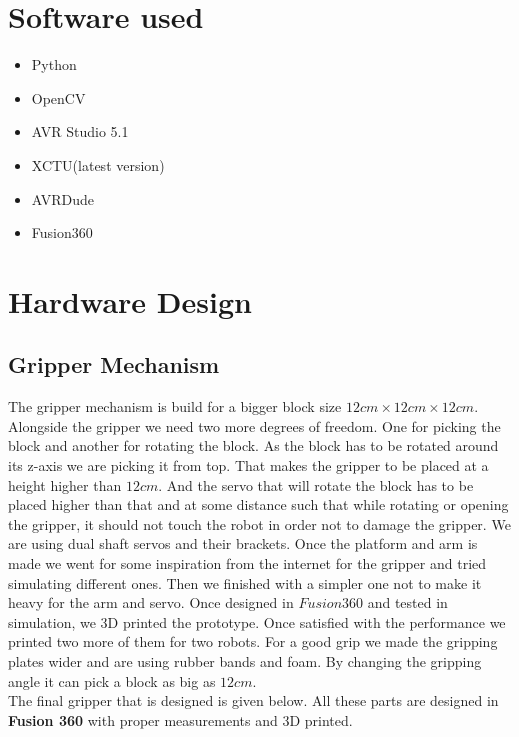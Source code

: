 \documentclass[a4paper,12pt,oneside]{book}
\begin{document}
\section{Software used}
\begin{itemize}
  \item Python
  \item OpenCV
  \item AVR Studio 5.1
  \item XCTU(latest version)
  \item AVRDude
  \item Fusion360
\end{itemize}
\section{Hardware Design}
\subsection*{Gripper Mechanism}
The gripper mechanism is build for a bigger block size $12cm\times{12cm\times{12cm}}$. Alongside the gripper we need two more degrees of freedom. One for picking the block and another for rotating the block. As the block has to be rotated around its z-axis we are picking it from top. That makes the gripper to be placed at a height higher than $12cm$. And the servo that will rotate the block has to be placed higher than that and at some
distance such that while rotating or opening the gripper, it should not touch the robot in order not to damage the gripper. We are using dual shaft servos and their brackets. Once the platform and arm is made we went for some inspiration from the internet for the gripper and tried simulating different ones. Then we finished with a simpler one not to make it heavy for the arm and servo. Once designed in $Fusion360$  and tested in simulation, we 3D printed the prototype. Once satisfied with the performance we printed two more of them for two robots. For a good grip we made the gripping plates wider and are using rubber bands and foam. By changing the gripping angle it can pick a block as big as $12cm$.\\
The final gripper that is designed is given below. All these parts are designed in \textbf{Fusion 360} with proper measurements and 3D printed.
\end{document}

